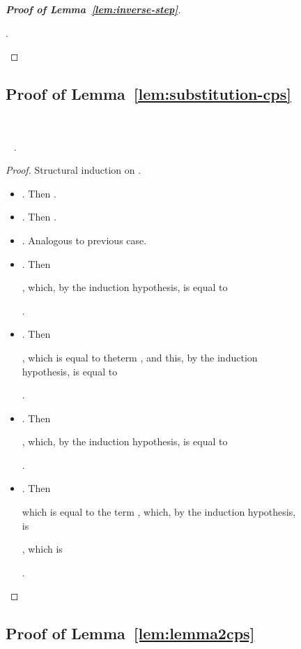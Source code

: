 \documentclass{LMCS}
\newcommand{\recap}[2]{\medskip\noindent{\bf #1 \ref{#2}.}~}
\begin{document}
\begin{figure}
{\begin{proof}[\bf Proof of Lemma~\ref{lem:inverse-step}]
\begin{itemize}
\begin{itemize}
	  
	  
	  .
	  \qedhere
      \end{itemize}
  \end{itemize}
\end{proof}

\subsection{Proof of Lemma~\ref{lem:substitution-cps}}\label{proof:substitution-cps}~

\recap{Lemma}{lem:substitution-cps}
.
\begin{proof}
  Structural induction on .
  \begin{itemize}
    \item . Then .
    \item . Then .
    \item . Analogous to previous case.
    \item . Then
      
      ,
      which, by the induction hypothesis, is equal to
      
      
      
      .
    \item . Then 
      
      ,
      which is equal to the\break term
      ,
      and this, by the induction hypothesis, is equal to
       
      
      
      
      
      .
    \item . Then
      
      
      ,
      which, by the induction hypothesis, is equal to
      
      
      
      
      .
    \item . Then 
      
      
      which is equal to the term
      ,
      which, by the induction hypothesis, is 
      
      , which is
      
      
      .
      \qedhere
  \end{itemize}
\end{proof}

\subsection{Proof of Lemma~\ref{lem:lemma2cps}}\label{proof:lemma2cps}~

}
\end{figure}
\end{document}
